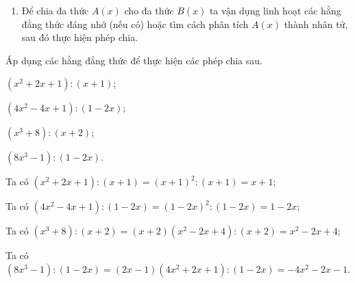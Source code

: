 %


\begin{dang}
	\begin{enumerate}[\tickEX]
		\item Để chia đa thức $A(x)$ cho đa thức  $B(x)$ ta vận dụng linh hoạt các hằng đẳng thức đáng nhớ (nếu có) hoặc tìm cách phân  tích $A(x)$ thành nhân tử, sau đó thực hiện phép chia.
	\end{enumerate}
\end{dang}
\begin{vd} %
	Áp dụng các hằng đẳng thức để thực hiện các phép chia sau.
		\begin{listEX}[2]
			\item $(x^2+2x+1):(x+1)$;
			\item $(4x^2-4x+1):(1-2x)$;
			\item $(x^3+8):(x+2)$;
			\item $(8x^3-1):(1-2x)$.
		\end{listEX}
		\loigiai
		{ 
			\begin{listEX}
			\item  Ta có $(x^2+2x+1):(x+1)=(x+1)^2:(x+1)=x+1$;
			\item Ta có $(4x^2-4x+1):(1-2x)=(1-2x)^2:(1-2x)=1-2x$;
			\item  Ta có $(x^3+8):(x+2)=(x+2)(x^2-2x+4):(x+2)=x^2-2x+4$;
			\item Ta có $(8x^3-1):(1-2x)=(2x-1)(4x^2+2x+1):(1-2x)=-4x^2-2x-1$.
			\end{listEX}	
	}
	\end{vd}
